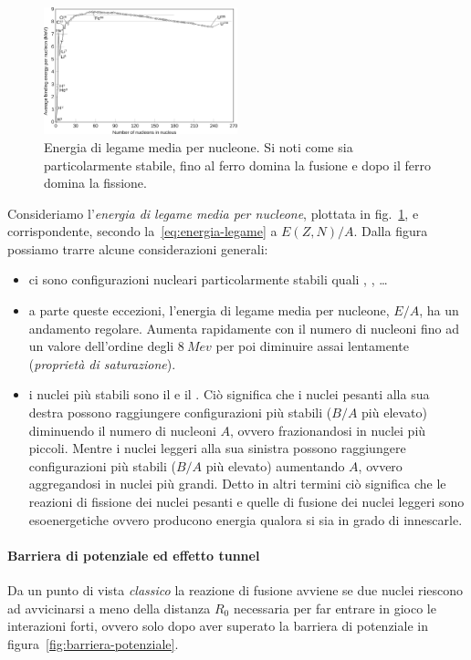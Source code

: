 \begin{figure}
    \centering
    \includegraphics[width=0.5\textwidth]{immagini/energia-legame.png}
    \caption{Energia di legame media per nucleone. Si noti come  sia particolarmente stabile, fino al ferro domina la fusione e dopo il ferro domina la fissione.}
    \label{fig:energia-legame}
\end{figure}

Consideriamo l'\emph{energia di legame media per nucleone}, plottata in fig.~\ref{fig:energia-legame}, e corrispondente, secondo la~\eqref{eq:energia-legame} a $E(Z,N) / A$. Dalla figura possiamo trarre alcune considerazioni generali:
\begin{itemize}
    \item ci sono configurazioni nucleari particolarmente stabili quali , ,  \dots
    \item a parte queste eccezioni, l’energia di legame media per nucleone, $E/A$, ha un andamento regolare. Aumenta rapidamente con il numero di nucleoni fino ad un valore dell’ordine degli $\SI{8}{Mev}$ per poi diminuire assai lentamente (\emph{proprietà di saturazione}).
    \item i nuclei più stabili sono il  e il . Ciò significa che i nuclei pesanti alla sua destra possono raggiungere configurazioni più stabili ($B/A$ più elevato) diminuendo il numero di nucleoni $A$, ovvero frazionandosi in nuclei più piccoli. Mentre i nuclei leggeri alla sua sinistra possono raggiungere configurazioni più stabili ($B/A$ più elevato) aumentando $A$, ovvero aggregandosi in nuclei più grandi. Detto in altri termini ciò significa che le reazioni di fissione dei nuclei pesanti e quelle di fusione dei nuclei leggeri sono esoenergetiche ovvero producono energia qualora si sia in grado di innescarle.
\end{itemize}

\paragraph{Barriera di potenziale ed effetto tunnel}
Da un punto di vista \emph{classico} la reazione di fusione avviene se due nuclei riescono ad avvicinarsi a meno della distanza $R_0$ necessaria per far entrare in gioco le interazioni forti, ovvero solo dopo aver superato la barriera di potenziale in figura~\ref{fig:barriera-potenziale}.

